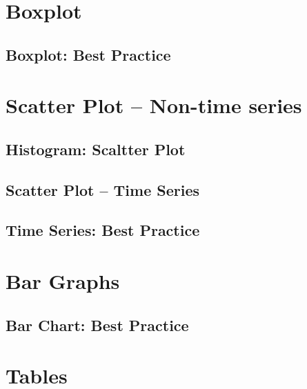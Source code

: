 \documentclass{article}\usepackage[]{graphicx}\usepackage[]{color}
\begin{document}
\section{Boxplot}

\subsection{Boxplot: Best Practice}

\section{Scatter Plot -- Non-time series}

\subsection{Histogram: Scaltter Plot}

\subsection{Scatter Plot -- Time Series}

\subsection{Time Series: Best Practice}

\section{Bar Graphs}

\subsection{Bar Chart: Best Practice}

\section{Tables}
\end{document}
